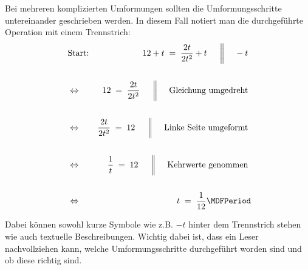 \begin{MIntro}
\begin{MExample}
Bei mehreren komplizierten Umformungen sollten die Umformungsschritte untereinander geschrieben werden. In diesem Fall notiert man die durchgeführte Operation mit einem Trennstrich:
\begin{eqnarray*}
& \text{Start:} & 12+t \;=\;\Mdfrac{2t}{2t^2}+t \ \ \ \ \MSep \ -t\ \\ \ \\
& \Leftrightarrow & 12 \;=\; \Mdfrac{2t}{2t^2}  \ \ \ \ \MSep \ \text{Gleichung umgedreht}\ \\ \ \\
& \Leftrightarrow & \Mdfrac{2t}{2t^2} \;=\; 12  \ \ \ \ \MSep \ \text{Linke Seite umgeformt}\ \\ \ \\
& \Leftrightarrow & \Mdfrac1t \;=\; 12  \ \ \ \ \MSep \ \text{Kehrwerte genommen}\ \\ \ \\
& \Leftrightarrow & t \;=\; \Mdfrac{1}{12} \MDFPeriod
\end{eqnarray*}

Dabei können sowohl kurze Symbole wie z.B. $-t$ hinter dem Trennstrich stehen wie auch textuelle Beschreibungen. Wichtig dabei ist, dass ein Leser nachvollziehen kann,
welche Umformungsschritte durchgeführt worden sind und ob diese richtig sind.
\end{MExample}
\end{MIntro}

